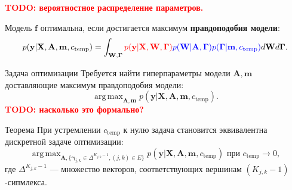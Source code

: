 \documentclass[usenames,dvipsnames,11pt,pdf,utf8,russian,aspectratio=169]{beamer}
\DeclareMathOperator*{\argmax}{arg\,max}
\begin{document}
\begin{frame}                                                                                            
\textcolor{red}{\textbf{TODO: вероятностное распределение параметров.\\}}

Модель $\mathbf{f}$  оптимальна, если достигается максимум \textbf{правдоподобия модели}:                                      
\[                                                                                                                                              
        p(\mathbf{y}|\mathbf{X},\mathbf{A},\mathbf{m}, c_{\text{temp}}) = \int_{\mathbf{W}, \boldsymbol{\Gamma} } \textcolor{red}{p(\mathbf{y}|\mathbf{X},\mathbf{W},  \boldsymbol{\Gamma})} \textcolor{blue}{p(\mathbf{W}|\mathbf{A}, \boldsymbol{\Gamma})p(\boldsymbol{\Gamma}|\mathbf{m}, c_{\text{temp}})} d\mathbf{W}d{\boldsymbol{\Gamma}}.                         
\]       


\begin{figure}
  \centering

\end{figure}
\end{frame}

\begin{frame}{Задача оптимизации}
Требуется найти гиперпараметры модели $\mathbf{A}, \mathbf{m}$ доставляющие максимум правдоподобия модели:
\[
    \argmax_{\mathbf{A}, \mathbf{m}}  p(\mathbf{y}|\mathbf{X},\mathbf{A},\mathbf{m}, c_{\text{temp}}).
\]                                                                                                                            
\textcolor{red}{\textbf{TODO: насколько это формально?\\}}
\begin{block}{Теорема}
При устремлении $c_{\text{temp}}$ к нулю задача становится эквивалентна дискретной задаче оптимизации:
\[
    \argmax_{\mathbf{A}, \{\boldsymbol{\gamma}_{j,k} \in \Delta^{K_{j,k} -1}, (j,k) \in E\}} p(\mathbf{y}|\mathbf{X},\mathbf{A},\mathbf{m}, c_{\text{temp}}) \text{ при }c_{\text{temp}} \to 0,
\]    
где $\Delta^{K_{j,k} -1}$ --- множество векторов, соответствующих вершинам $(K_{j,k}-1)$-сипмлекса.
\end{block}           
\end{frame}  
\end{document}
